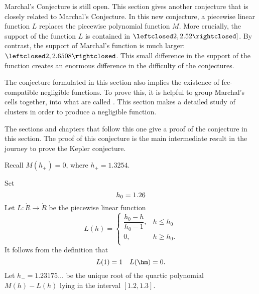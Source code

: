 \begin{summary} Marchal's Conjecture is still open.  This section
gives another conjecture that is closely related to Marchal's
Conjecture.  In this new conjecture, a piecewise linear function $L$
replaces the piecewise polynomial function $M$.  More crucially, the
support of the function $L$ is contained in
$\leftclosed2,2.52\rightclosed]$.  By contrast, the support of
Marchal's function is much larger:
$\leftclosed2,2.6508\rightclosed$.  This small difference in the
support of the function creates an enormous difference in the
difficulty of the conjectures.

The conjecture formulated in this section also implies the existence
of fcc-compatible negligible functions.  To prove this, it is
helpful to group Marchal's cells together, into what are called
.  This section makes a detailed study of clusters
in order to produce a negligible function.

The sections and chapters that follow this one give a proof of the
conjecture in this section.  The proof of this conjecture is the
main intermediate result in the journey to prove the Kepler
conjecture.
\end{summary}

Recall $M(h_+) = 0$, where   $h_+ = 1.3254$.
%

\begin{definition}[$L$,~$h_0$,~$h_-$]\label{def:L}
Set
\begin{displaymath}
h_0 = 1.26\\  %
\end{displaymath}
Let $L:\ring{R}\to\ring{R}$ be the piecewise linear function 
\begin{displaymath}
L(h) = \begin{cases}
\dfrac{h_0-h}{h_0-1}, & h \le h_0 \\
0, & h\ge h_0. \\
\end{cases}
\end{displaymath}
It follows from the definition that
\begin{displaymath}
L(1) = 1\quad L(\hm) = 0.
\end{displaymath}
Let $h_- = 1.23175\ldots$ be the unique root of the quartic polynomial
$M(h)-L(h)$ lying in the interval $[1.2,1.3]$.
%
%
%
\end{definition}

